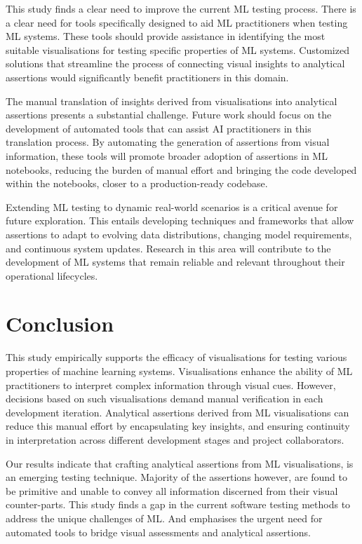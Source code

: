 \documentclass[conference]{IEEEtran}
\begin{document}
This study finds a clear need to improve the current ML testing process. There is a clear need for tools specifically designed to aid ML practitioners when testing ML systems. These tools should provide assistance in identifying the most suitable visualisations for testing specific properties of ML systems. Customized solutions that streamline the process of connecting visual insights to analytical assertions would significantly benefit practitioners in this domain.

The manual translation of insights derived from visualisations into analytical assertions presents a substantial challenge. Future work should focus on the development of automated tools that can assist AI practitioners in this translation process. By automating the generation of assertions from visual information, these tools will promote broader adoption of assertions in ML notebooks, reducing the burden of manual effort and bringing the code developed within the notebooks, closer to a production-ready codebase.

Extending ML testing to dynamic real-world scenarios is a critical avenue for future exploration. This entails developing techniques and frameworks that allow assertions to adapt to evolving data distributions, changing model requirements, and continuous system updates. Research in this area will contribute to the development of ML systems that remain reliable and relevant throughout their operational lifecycles.

\section{Conclusion}\label{sec:conclude}

This study empirically supports the efficacy of visualisations for testing various properties of machine learning systems. Visualisations enhance the ability of ML practitioners to interpret complex information through visual cues. However, decisions based on such visualisations demand manual verification in each development iteration. Analytical assertions derived from ML visualisations can reduce this manual effort by encapsulating key insights, and ensuring continuity in interpretation across different development stages and project collaborators.

Our results indicate that crafting analytical assertions from ML visualisations, is an emerging testing technique. Majority of the assertions however, are found to be primitive and unable to convey all information discerned from their visual counter-parts. This study finds a gap in the current software testing methods to address the unique challenges of ML. And emphasises the urgent need for automated tools to bridge visual assessments and analytical assertions.



\end{document}
